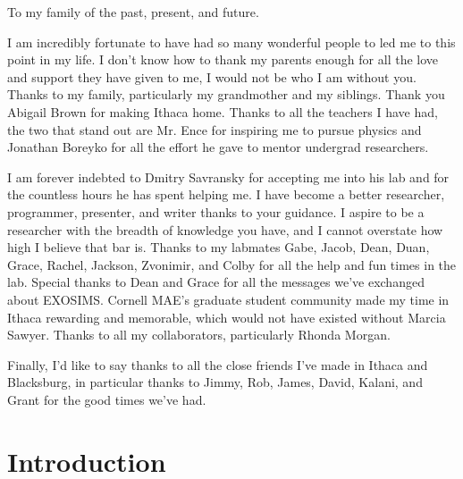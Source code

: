 \documentclass[phd,tocprelim]{cornell}
\begin{document}
\begin{dedication}
To my family of the past, present, and future.
\end{dedication}

\begin{acknowledgements}

I am incredibly fortunate to have had so many wonderful people to led me to
this point in my life. I don't know how to thank my parents enough for all the
love and support they have given to me, I would not be who I am without you.
Thanks to my family, particularly my grandmother and my siblings. Thank you
Abigail Brown for making Ithaca home. Thanks to all the teachers I have had,
the two that stand out are Mr. Ence for inspiring me to pursue physics and
Jonathan Boreyko for all the effort he gave to mentor undergrad researchers.

I am forever indebted to Dmitry Savransky for accepting me into his lab and for
the countless hours he has spent helping me. I have become a better researcher,
programmer, presenter, and writer thanks to your guidance. I aspire to be a
researcher with the breadth of knowledge you have, and I cannot overstate how
high I believe that bar is. Thanks to my labmates Gabe, Jacob, Dean, Duan,
Grace, Rachel, Jackson, Zvonimir, and Colby for all the help and fun times in
the lab. Special thanks to Dean and Grace for all the messages we've exchanged
about EXOSIMS. Cornell MAE's graduate student community made my time in Ithaca
rewarding and memorable, which would not have existed without Marcia Sawyer.
Thanks to all my collaborators, particularly Rhonda Morgan.

Finally, I'd like to say thanks to all the close friends I've made in Ithaca
and Blacksburg, in particular thanks to Jimmy, Rob, James, David, Kalani, and
Grant for the good times we've had.


\end{acknowledgements}

\contentspage
\tablelistpage
\figurelistpage

\normalspacing \setcounter{page}{1} 
\pagestyle{cornell} \addtolength{\parskip}{0.5\baselineskip}

\chapter{Introduction}
\label{cha:intro}

\end{document}
